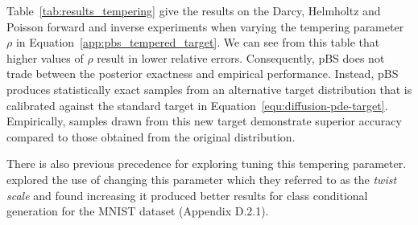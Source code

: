 Table~\ref{tab:results_tempering} give the results on the Darcy, Helmholtz and Poisson forward and inverse experiments when varying the tempering parameter $\rho$ in Equation~\eqref{app:pbs_tempered_target}. We can see from this table that higher values of $\rho$ result in lower relative errors. Consequently, pBS does not trade between the posterior exactness and empirical performance. 
Instead, pBS produces statistically exact samples from an alternative target distribution that is calibrated against the standard target in Equation~\eqref{equ:diffusion-pde-target}.
Empirically, samples drawn from this new target demonstrate superior accuracy compared to those obtained from the original distribution. 

There is also previous precedence for exploring tuning this tempering parameter. \citet{wu2023-TDS} explored the use of changing this parameter which they referred to as the \emph{twist scale} and found increasing it produced better results for class conditional generation for the MNIST dataset (Appendix D.2.1). 


